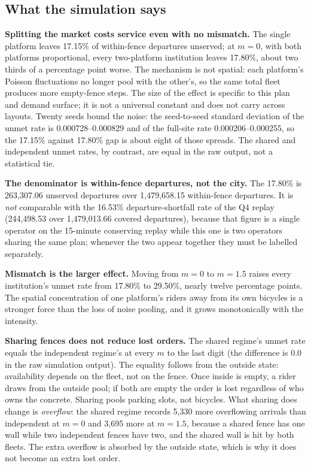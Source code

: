 \subsection{What the simulation says}

\textbf{Splitting the market costs service even with no mismatch.} The single platform
leaves 17.15\% of within-fence departures unserved; at $m=0$, with both platforms
proportional, every two-platform institution leaves 17.80\%, about two thirds of a
percentage point worse. The mechanism is not spatial: each platform's Poisson
fluctuations no longer pool with the other's, so the same total fleet produces more
empty-fence steps. The size of the effect is specific to this plan and demand surface;
it is not a universal constant and does not carry across layouts. Twenty seeds bound
the noise: the seed-to-seed standard deviation of the unmet rate is
0.000728--0.000829 and of the full-site rate 0.000206--0.000255, so the 17.15\% against
17.80\% gap is about eight of those spreads. The shared and independent unmet rates, by
contrast, are equal in the raw output, not a statistical tie.

\textbf{The denominator is within-fence departures, not the city.} The 17.80\% is
263,307.06 unserved departures over 1,479,658.15 within-fence departures. It is
\emph{not} comparable with the 16.53\% departure-shortfall rate of the Q4 replay
(244,498.53 over 1,479,013.66 covered departures), because that figure is a single
operator on the 15-minute conserving replay while this one is two operators sharing
the same plan; whenever the two appear together they must be labelled separately.

\textbf{Mismatch is the larger effect.} Moving from $m=0$ to $m=1.5$ raises every
institution's unmet rate from 17.80\% to 29.50\%, nearly twelve percentage points. The
spatial concentration of one platform's riders away from its own bicycles is a stronger
force than the loss of noise pooling, and it grows monotonically with the intensity.

\textbf{Sharing fences does not reduce lost orders.} The shared regime's
unmet rate equals the independent regime's at every $m$ to the last digit (the
difference is 0.0 in the raw simulation output). The equality follows from the outside
state: availability depends on the fleet, not on the fence. Once inside is empty, a
rider draws from the outside pool; if both are empty the order is
lost regardless of who owns the concrete. Sharing pools parking slots, not bicycles.
What sharing does change is \emph{overflow}: the shared regime records 5,330 more
overflowing arrivals than independent at $m=0$ and 3,695 more at $m=1.5$, because a
shared fence has one wall while two independent fences have two, and the shared wall is
hit by both fleets. The extra overflow is absorbed by the outside state, which is why it
does not become an extra lost order.


